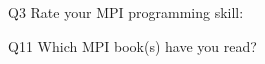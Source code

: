 \begin{description}%
\item{Q3} Rate your MPI programming skill:%
\item{Q11} Which MPI book(s) have you read?%
\end{description}%
